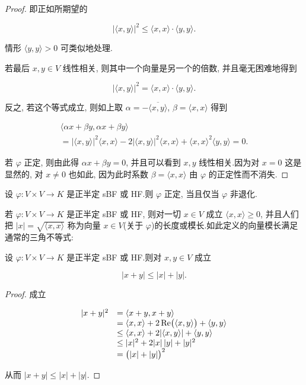 \begin{proof}
即正如所期望的

\[
|\langle x, y \rangle|^2 \leq \langle x, x \rangle \cdot \langle y, y \rangle\text{.}
\]

情形 $\langle y, y \rangle > 0$ 可类似地处理.

若最后 $x, y \in V$ 线性相关, 则其中一个向量是另一个的倍数, 并且毫无困难地得到

\[
|\langle x, y \rangle|^2 = \langle x, x \rangle \cdot \langle y, y \rangle\text{.}
\]

反之, 若这个等式成立, 则如上取 $\alpha = -\overline{\langle x, y \rangle}$, $\beta = \langle x, x \rangle$ 得到

\[
\begin{array}{c}
\langle \alpha x + \beta y, \alpha x + \beta y \rangle \\
= |\langle x, y \rangle|^2 \langle x, x \rangle - 2|\langle x, y \rangle|^2 \langle x, x \rangle + \langle x, x \rangle^2 \langle y, y \rangle = 0\text{.}
\end{array}
\]

若 $\varphi$ 正定, 则由此得 $\alpha x + \beta y = 0$, 并且可以看到 $x, y$ 线性相关.因为对 $x = 0$ 这是显然的, 对 $x \neq 0$ 也如此, 因为此时系数 $\beta = \langle x, x \rangle$ 由 $\varphi$ 的正定性而不消失.
\end{proof}

\begin{corollary}\label{cor:7.1.5}
设 $\varphi \colon V \times V \longrightarrow K$ 是正半定 sBF 或 HF.则 $\varphi$ 正定, 当且仅当 $\varphi$ 非退化.
\end{corollary}

若 $\varphi \colon V \times V \longrightarrow K$ 是正半定 sBF 或 HF, 则对一切 $x \in V$ 成立 $\langle x, x \rangle \geq 0$, 并且人们把 $|x| = \sqrt{\langle x, x \rangle}$ 称为向量 $x \in V$(关于 $\varphi$)的长度或模长.如此定义的向量模长满足通常的三角不等式:

\begin{corollary}[三角不等式]\label{cor:7.1.6}
设 $\varphi \colon V \times V \longrightarrow K$ 是正半定 sBF 或 HF.则对 $x, y \in V$ 成立

\[
|x + y| \leq |x| + |y|\text{.}
\]
\end{corollary}

\begin{proof}
成立

\[
\begin{array}{r l}
|x + y|^2 & = \langle x + y, x + y \rangle \\
& = \langle x, x \rangle + 2\operatorname{Re}\bigl(\langle x, y \rangle\bigr) + \langle y, y \rangle \\
& \leq \langle x, x \rangle + 2|\langle x, y \rangle| + \langle y, y \rangle \\
& \leq |x|^2 + 2|x| \, |y| + |y|^2 \\
& = \bigl(|x| + |y|\bigr)^2
\end{array}
\]

从而 $|x + y| \leq |x| + |y|$.
\end{proof}

